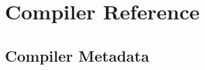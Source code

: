 \chapter{Compiler Reference}
\label{compiler-reference}

\section{Compiler Metadata}
\label{cr-metadata}